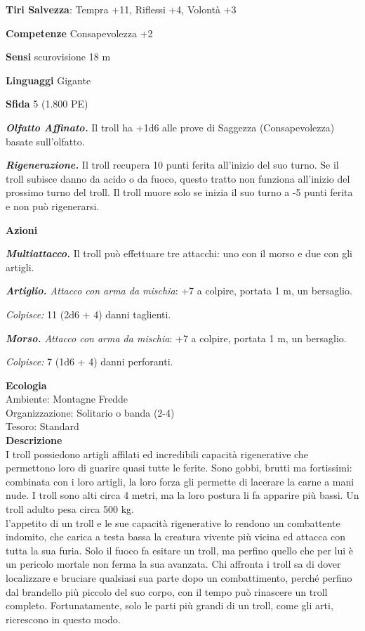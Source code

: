 \begin{multicols}{2}
\textbf{Tiri Salvezza}: Tempra +11, Riflessi +4, Volontà +3

\textbf{Competenze} Consapevolezza +2

\textbf{Sensi} scurovisione 18 m

\textbf{Linguaggi} Gigante

\textbf{Sfida} 5 (1.800 PE)

\emph{\textbf{Olfatto Affinato.}} Il troll ha +1d6 alle prove di Saggezza (Consapevolezza) basate sull'olfatto.

\emph{\textbf{Rigenerazione.}} Il troll recupera 10 punti ferita all'inizio del suo turno. Se il troll subisce danno da acido o da fuoco, questo tratto non funziona all'inizio del prossimo turno del troll. Il troll muore solo se inizia il suo turno a -5 punti ferita e non può rigenerarsi.

\textbf{Azioni}

\emph{\textbf{Multiattacco.}} Il troll può effettuare tre attacchi: uno con il morso e due con gli artigli.

\emph{\textbf{Artiglio.} Attacco con arma da mischia}: +7 a colpire, portata 1 m, un bersaglio.

\emph{Colpisce:} 11 (2d6 + 4) danni taglienti.

\emph{\textbf{Morso.} Attacco con arma da mischia}: +7 a colpire, portata 1 m, un bersaglio.

\emph{Colpisce:} 7 (1d6 + 4) danni perforanti.

\textbf{Ecologia}\\
Ambiente: Montagne Fredde\\
Organizzazione: Solitario o banda (2-4)\\
Tesoro: Standard\\
\textbf{Descrizione}\\
I troll possiedono artigli affilati ed incredibili capacità rigenerative che permettono loro di guarire quasi tutte le ferite. Sono gobbi, brutti ma fortissimi: combinata con i loro artigli, la loro forza gli permette di lacerare la carne a mani nude. I troll sono alti circa 4 metri, ma la loro postura li fa apparire più bassi. Un troll adulto pesa circa 500 kg.\\

l'appetito di un troll e le sue capacità rigenerative lo rendono un combattente indomito, che carica a testa bassa la creatura vivente più vicina ed attacca con tutta la sua furia. Solo il fuoco fa esitare un troll, ma perfino quello che per lui è un pericolo mortale non ferma la sua avanzata. Chi affronta i troll sa di dover localizzare e bruciare qualsiasi sua parte dopo un combattimento, perché perfino dal brandello più piccolo del suo corpo, con il tempo può rinascere un troll completo. Fortunatamente, solo le parti più grandi di un troll, come gli arti, ricrescono in questo modo.\\


\end{multicols}
